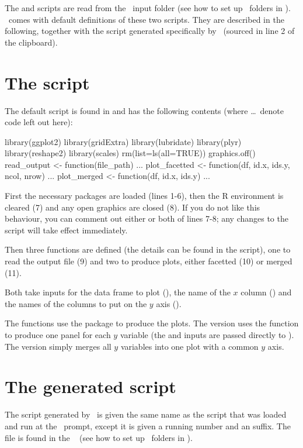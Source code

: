 The  and  scripts are read from the \US\ input folder (see how to set up \US\ folders in ). \US\ comes with default definitions of these two scripts. They are  described in the following, together with the script generated specifically by \US\ (sourced in line 2 of the clipboard).

\section{The  script}

The default  script is found in  and has the following contents (where \ldots\ denote code left out here):
\lstset{numbers=left}
\begin{rscript}
library(ggplot2)
library(gridExtra)
library(lubridate)
library(plyr)
library(reshape2)
library(scales)
rm(list=ls(all=TRUE))
graphics.off()
read_output <- function(file_path) {...}
plot_facetted <- function(df, id.x, ids.y,
	ncol, nrow) {...}
plot_merged <- function(df, id.x, ids.y) {...}
\end{rscript}
\lstset{numbers=none}

First the necessary packages are loaded (lines 1-6), then the R environment is cleared (7) and any open graphics are closed (8). If you do not like this behaviour, you can comment out either or both of lines 7-8; any changes to the  script will take effect immediately. 

Then three functions are defined (the details can be found in the  script), one to read the output file (9) and two to produce plots, either facetted (10) or merged (11). 

Both  take inputs for the data frame to plot (), the name of the \(x\) column () and the names of the columns to put on the \(y\) axis (). 

The functions use the  package to produce the plots. The  version uses the  function  to produce one panel for each \(y\) variable (the  and  inputs are passed directly to ). The  version simply merges all \(y\) variables into one plot with a common \(y\) axis.

\section{The generated script}
The script generated by \US\ is given the same name as the script that was loaded and run at the \US\ prompt, except it is given a running number and an  suffix. The file is found in the \US\  (see how to set up \US\ folders in ). 

